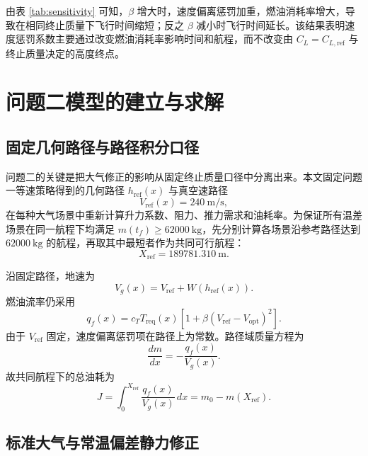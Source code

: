 \documentclass[withoutpreface,bwprint]{cumcmthesis}
\begin{document}
由表 \ref{tab:sensitivity} 可知，$\beta$ 增大时，速度偏离惩罚加重，燃油消耗率增大，导致在相同终止质量下飞行时间缩短；反之 $\beta$ 减小时飞行时间延长。该结果表明速度惩罚系数主要通过改变燃油消耗率影响时间和航程，而不改变由 $C_L=C_{L,\mathrm{ref}}$ 与终止质量决定的高度终点。

\section{问题二模型的建立与求解}

\subsection{固定几何路径与路径积分口径}

问题二的关键是把大气修正的影响从固定终止质量口径中分离出来。本文固定问题一等速策略得到的几何路径 $h_{\mathrm{ref}}(x)$ 与真空速路径
\begin{equation}
V_{\mathrm{ref}}(x)=240\ \mathrm{m/s},
\end{equation}
在每种大气场景中重新计算升力系数、阻力、推力需求和油耗率。为保证所有温差场景在同一航程下均满足 $m(t_f)\geq 62000\ \mathrm{kg}$，先分别计算各场景沿参考路径达到 $62000\ \mathrm{kg}$ 的航程，再取其中最短者作为共同可行航程：
\begin{equation}
X_{\mathrm{ref}}=189781.310\ \mathrm{m}.
\label{eq:q2_Xref}
\end{equation}

沿固定路径，地速为
\begin{equation}
V_g(x)=V_{\mathrm{ref}}+W(h_{\mathrm{ref}}(x)).
\end{equation}
燃油流率仍采用
\begin{equation}
q_f(x)=c_T T_{\mathrm{req}}(x)\left[1+\beta(V_{\mathrm{ref}}-V_{\mathrm{opt}})^2\right].
\label{eq:q2_fuel_flow}
\end{equation}
由于 $V_{\mathrm{ref}}$ 固定，速度偏离惩罚项在路径上为常数。路径域质量方程为
\begin{equation}
\frac{dm}{dx}=-\frac{q_f(x)}{V_g(x)}.
\label{eq:q2_dmdx}
\end{equation}
故共同航程下的总油耗为
\begin{equation}
J=\int_0^{X_{\mathrm{ref}}}\frac{q_f(x)}{V_g(x)}\,dx
=m_0-m(X_{\mathrm{ref}}).
\label{eq:q2_path_integral}
\end{equation}

\subsection{标准大气与常温偏差静力修正}
\end{document}
